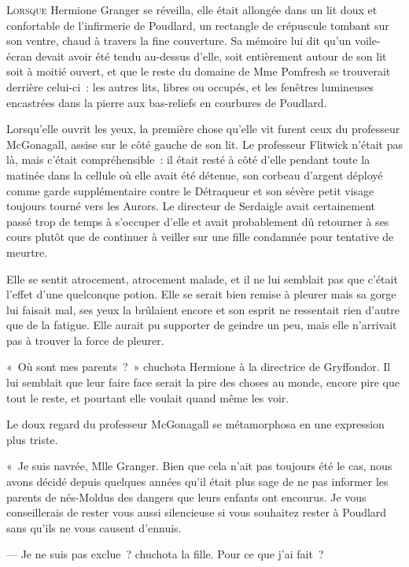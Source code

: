 
\lettrine{L}{orsque} Hermione Granger se réveilla, elle était allongée dans un lit doux et confortable de l'infirmerie de Poudlard, un rectangle de crépuscule tombant sur son ventre, chaud à travers la fine couverture. Sa mémoire lui dit qu'un voile-écran devait avoir été tendu au-dessus d'elle, soit entièrement autour de son lit soit à moitié ouvert, et que le reste du domaine de Mme Pomfresh se trouverait derrière celui-ci~: les autres lits, libres ou occupés, et les fenêtres lumineuses encastrées dans la pierre aux bas-reliefs en courbures de Poudlard.

Lorsqu'elle ouvrit les yeux, la première chose qu'elle vit furent ceux du professeur McGonagall, assise sur le côté gauche de son lit. Le professeur Flitwick n'était pas là, mais c'était compréhensible~: il était resté à côté d'elle pendant toute la matinée dans la cellule où elle avait été détenue, son corbeau d'argent déployé comme garde supplémentaire contre le Détraqueur et son sévère petit visage toujours tourné vers les Aurors. Le directeur de Serdaigle avait certainement passé trop de temps à s'occuper d'elle et avait probablement dû retourner à ses cours plutôt que de continuer à veiller sur une fille condamnée pour tentative de meurtre.

Elle se sentit atrocement, atrocement malade, et il ne lui semblait pas que c'était l'effet d'une quelconque potion. Elle se serait bien remise à pleurer mais sa gorge lui faisait mal, ses yeux la brûlaient encore et son esprit ne ressentait rien d'autre que de la fatigue. Elle aurait pu supporter de geindre un peu, mais elle n'arrivait pas à trouver la force de pleurer.

«~Où sont mes parents~?~» chuchota Hermione à la directrice de Gryffondor. Il lui semblait que leur faire face serait la pire des choses au monde, encore pire que tout le reste, et pourtant elle voulait quand même les voir.

Le doux regard du professeur McGonagall se métamorphosa en une expression plus triste.

«~Je suis navrée, Mlle Granger. Bien que cela n'ait pas toujours été le cas, nous avons décidé depuis quelques années qu'il était plus sage de ne pas informer les parents de nés-Moldus des dangers que leurs enfants ont encourus. Je vous conseillerais de rester vous aussi silencieuse si vous souhaitez rester à Poudlard sans qu'ils ne vous causent d'ennuis.

--- Je ne suis pas exclue~? chuchota la fille. Pour ce que j'ai fait~?

